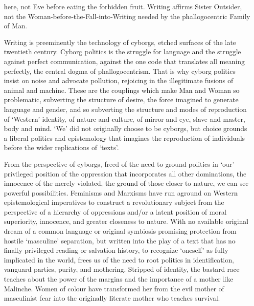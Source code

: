 \documentclass[DIV=12,%
               BCOR=10mm,%
               headinclude=false,%
               footinclude=false,open=any,%
               fontsize=11pt,%
               twoside,%
               paper=210mm:11in]%
               {scrbook}
\newcommand*{\Slash}{\slash\hspace{0pt}}
\begin{document}
here, not Eve before eating the forbidden fruit. Writing affirms Sister Outsider, not the Woman-before-the-Fall-into-Writing needed by the phallogocentric Family of Man.


Writing is preeminently the technology of cyborgs, etched surfaces of the late twentieth century. Cyborg politics is the struggle for language and the struggle against perfect communication, against the one code that translates all meaning perfectly, the central dogma of phallogocentrism. That is why cyborg politics insist on noise and advocate pollution, rejoicing in the illegitimate fusions of animal and machine. These are the couplings which make Man and Woman so problematic, subverting the structure of desire, the force imagined to generate language and gender, and so subverting the structure and modes of reproduction of ‘Western’ identity, of nature and culture, of mirror and eye, slave and master, body and mind. ‘We’ did not originally choose to be cyborgs, but choice grounds a liberal politics and epistemology that imagines the reproduction of individuals before the wider replications of ‘texts’.


From the perspective of cyborgs, freed of the need to ground politics in ‘our’ privileged position of the oppression that incorporates all other dominations, the innocence of the merely violated, the ground of those closer to nature, we can see powerful possibilities. Feminisms and Marxisms have run aground on Western epistemological imperatives to construct a revolutionary subject from the perspective of a hierarchy of oppressions and\Slash{}or a latent position of moral superiority, innocence, and greater closeness to nature. With no available original dream of a common language or original symbiosis promising protection from hostile ‘masculine’ separation, but written into the play of a text that has no finally privileged reading or salvation history, to recognize ‘oneself’ as fully implicated in the world, frees us of the need to root politics in identification, vanguard parties, purity, and mothering. Stripped of identity, the bastard race teaches about the power of the margins and the importance of a mother like Malinche. Women of colour have transformed her from the evil mother of masculinist fear into the originally literate mother who teaches survival.
\end{document}
